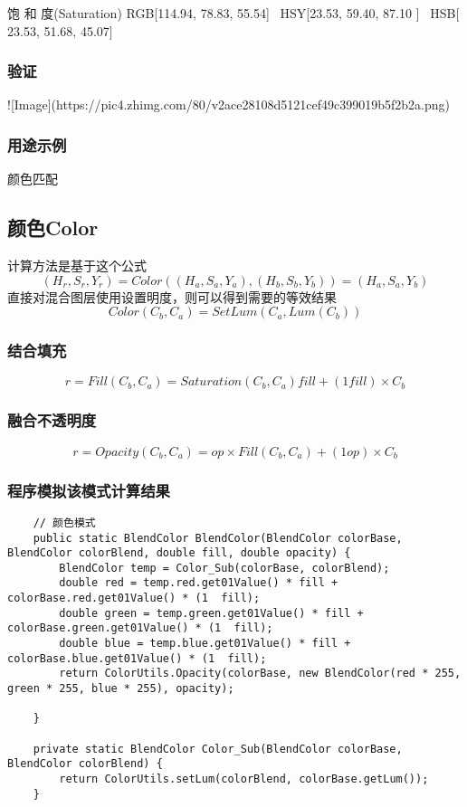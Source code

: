 饱 和 度(Saturation)    RGB[114.94,  78.83,  55.54]~ HSY[23.53,  59.40,  87.10 ]~ HSB[ 23.53,  51.68,  45.07]


\subsubsection{ 验证}

![Image](https://pic4.zhimg.com/80/v2ace28108d5121cef49c399019b5f2b2a.png)

\subsubsection{ 用途示例}

颜色匹配

\subsection{ 颜色Color}

计算方法是基于这个公式
$$(H_r,S_r,Y_r)= Color((H_a,S_a,Y_a),(H_b,S_b,Y_b))=(H_a,S_a,Y_b)$$
直接对混合图层使用设置明度，则可以得到需要的等效结果
$$Color(C_b,C_a)=SetLum(C_a,Lum(C_b))$$

\subsubsection{ 结合填充}

$$r=Fill(C_b,C_a)= Saturation(C_b,C_a) fill + (1fill)\times C_b$$

\subsubsection{ 融合不透明度}

$$r=Opacity(C_b,C_a)=op\times Fill(C_b,C_a)+(1op)\times C_b$$

\subsubsection{ 程序模拟该模式计算结果}

\begin{lstlisting}
	// 颜色模式
	public static BlendColor BlendColor(BlendColor colorBase, BlendColor colorBlend, double fill, double opacity) {
		BlendColor temp = Color_Sub(colorBase, colorBlend);
		double red = temp.red.get01Value() * fill + colorBase.red.get01Value() * (1  fill);
		double green = temp.green.get01Value() * fill + colorBase.green.get01Value() * (1  fill);
		double blue = temp.blue.get01Value() * fill + colorBase.blue.get01Value() * (1  fill);
		return ColorUtils.Opacity(colorBase, new BlendColor(red * 255, green * 255, blue * 255), opacity);
		
	}
	
	private static BlendColor Color_Sub(BlendColor colorBase, BlendColor colorBlend) {
		return ColorUtils.setLum(colorBlend, colorBase.getLum());
	}
\end{lstlisting}



